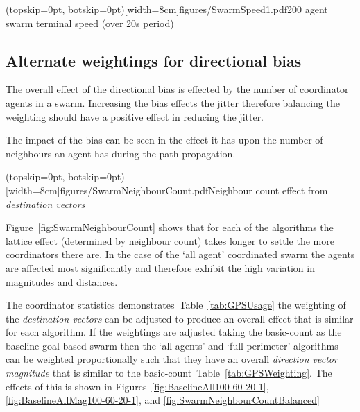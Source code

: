 \documentclass{ieeeaccess}
\begin{document}

\Figure[t!](topskip=0pt, botskip=0pt)[width=8cm]{figures/SwarmSpeed1.pdf}{200 agent swarm terminal speed (over 20s period)\label{fig:SwarmSpeed1}}

\subsection{Alternate weightings for directional bias}\label{sec:AlternateBias1}
The overall effect of the directional bias is effected by the number of coordinator agents in a swarm. Increasing the bias effects the jitter therefore balancing the weighting should have a positive effect in reducing the jitter.

The impact of the bias can be seen in the effect it has upon the number of neighbours an agent has during the path propagation.


\Figure[t!](topskip=0pt, botskip=0pt)[width=8cm]{figures/SwarmNeighbourCount.pdf}{Neighbour count effect from \textit{destination vectors}\label{fig:SwarmNeighbourCount}}

Figure~\ref{fig:SwarmNeighbourCount} shows that for each of the algorithms the lattice effect (determined by neighbour count) takes longer to settle the more coordinators there are. In the case of the `all agent' coordinated swarm the agents are affected most significantly and therefore exhibit the high variation in magnitudes and distances.

The coordinator statistics demonstrates~Table~\ref{tab:GPSUsage} the weighting of the \textit{destination vectors} can be adjusted to produce an overall effect that is similar for each algorithm. If the weightings are adjusted taking the basic-count as the baseline goal-based swarm then the `all agents' and `full perimeter' algorithms can be weighted proportionally such that they have an overall \textit{direction vector magnitude} that is similar to the basic-count~Table~\ref{tab:GPSWeighting}. The effects of this is shown in Figures~\ref{fig:BaselineAll100-60-20-1}, \ref{fig:BaselineAllMag100-60-20-1}, and \ref{fig:SwarmNeighbourCountBalanced}
\end{document}
